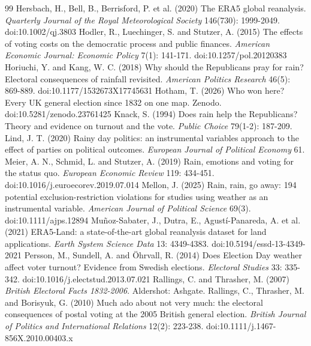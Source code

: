 \documentclass[11pt,a4paper]{article}
\begin{document}
\begin{thebibliography}{99}
 Hersbach, H., Bell, B., Berrisford, P. et al. (2020) The ERA5 global reanalysis. \textit{Quarterly Journal of the Royal Meteorological Society} 146(730): 1999-2049. doi:10.1002/qj.3803
 Hodler, R., Luechinger, S. and Stutzer, A. (2015) The effects of voting costs on the democratic process and public finances. \textit{American Economic Journal: Economic Policy} 7(1): 141-171. doi:10.1257/pol.20120383
 Horiuchi, Y. and Kang, W. C. (2018) Why should the Republicans pray for rain? Electoral consequences of rainfall revisited. \textit{American Politics Research} 46(5): 869-889. doi:10.1177/1532673X17745631
 Hotham, T. (2026) Who won here? Every UK general election since 1832 on one map. Zenodo. doi:10.5281/zenodo.23761425
 Knack, S. (1994) Does rain help the Republicans? Theory and evidence on turnout and the vote. \textit{Public Choice} 79(1-2): 187-209.
 Lind, J. T. (2020) Rainy day politics: an instrumental variables approach to the effect of parties on political outcomes. \textit{European Journal of Political Economy} 61.
 Meier, A. N., Schmid, L. and Stutzer, A. (2019) Rain, emotions and voting for the status quo. \textit{European Economic Review} 119: 434-451. doi:10.1016/j.euroecorev.2019.07.014
 Mellon, J. (2025) Rain, rain, go away: 194 potential exclusion-restriction violations for studies using weather as an instrumental variable. \textit{American Journal of Political Science} 69(3). doi:10.1111/ajps.12894
 Mu\~noz-Sabater, J., Dutra, E., Agust\'i-Panareda, A. et al. (2021) ERA5-Land: a state-of-the-art global reanalysis dataset for land applications. \textit{Earth System Science Data} 13: 4349-4383. doi:10.5194/essd-13-4349-2021
 Persson, M., Sundell, A. and \"Ohrvall, R. (2014) Does Election Day weather affect voter turnout? Evidence from Swedish elections. \textit{Electoral Studies} 33: 335-342. doi:10.1016/j.electstud.2013.07.021
 Rallings, C. and Thrasher, M. (2007) \textit{British Electoral Facts 1832-2006}. Aldershot: Ashgate.
 Rallings, C., Thrasher, M. and Borisyuk, G. (2010) Much ado about not very much: the electoral consequences of postal voting at the 2005 British general election. \textit{British Journal of Politics and International Relations} 12(2): 223-238. doi:10.1111/j.1467-856X.2010.00403.x

\end{thebibliography}
\end{document}
